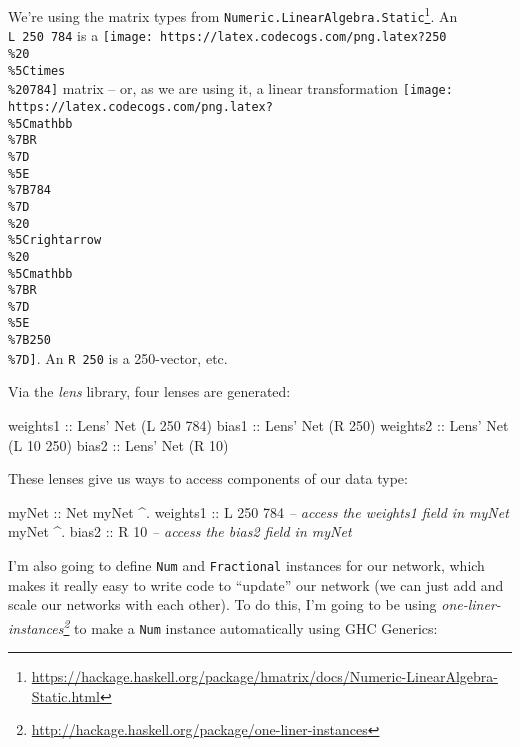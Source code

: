 \documentclass[]{article}
\newenvironment{Shaded}{}{}
\newcommand{\CommentTok}[1]{\textcolor[rgb]{0.38,0.63,0.69}{\textit{#1}}}
\newcommand{\DataTypeTok}[1]{\textcolor[rgb]{0.56,0.13,0.00}{#1}}
\newcommand{\DecValTok}[1]{\textcolor[rgb]{0.25,0.63,0.44}{#1}}
\newcommand{\FunctionTok}[1]{\textcolor[rgb]{0.02,0.16,0.49}{#1}}
\newcommand{\NormalTok}[1]{#1}
\newcommand{\OtherTok}[1]{\textcolor[rgb]{0.00,0.44,0.13}{#1}}
\renewcommand{\href}[2]{#2\footnote{\url{#1}}}
\begin{document}
We're using the matrix types from
\href{https://hackage.haskell.org/package/hmatrix/docs/Numeric-LinearAlgebra-Static.html}{\texttt{Numeric.LinearAlgebra.Static}}.
An \texttt{L\ 250\ 784} is a
\texttt{[image: https://latex.codecogs.com/png.latex?250\\\%20\\\%5Ctimes\\\%20784]}
matrix -- or, as we are using it, a linear transformation
\texttt{[image: https://latex.codecogs.com/png.latex?\\\%5Cmathbb\\\%7BR\\\%7D\\\%5E\\\%7B784\\\%7D\\\%20\\\%5Crightarrow\\\%20\\\%5Cmathbb\\\%7BR\\\%7D\\\%5E\\\%7B250\\\%7D]}.
An \texttt{R\ 250} is a 250-vector, etc.

Via the \emph{lens} library, four lenses are generated:

\begin{Shaded}
\begin{Highlighting}[]
\OtherTok{weights1 ::} \DataTypeTok{Lens'} \DataTypeTok{Net}\NormalTok{ (}\DataTypeTok{L} \DecValTok{250} \DecValTok{784}\NormalTok{)}
\OtherTok{bias1    ::} \DataTypeTok{Lens'} \DataTypeTok{Net}\NormalTok{ (}\DataTypeTok{R} \DecValTok{250}\NormalTok{)}
\OtherTok{weights2 ::} \DataTypeTok{Lens'} \DataTypeTok{Net}\NormalTok{ (}\DataTypeTok{L} \DecValTok{10}  \DecValTok{250}\NormalTok{)}
\OtherTok{bias2    ::} \DataTypeTok{Lens'} \DataTypeTok{Net}\NormalTok{ (}\DataTypeTok{R} \DecValTok{10}\NormalTok{)}
\end{Highlighting}
\end{Shaded}

These lenses give us ways to access components of our data type:

\begin{Shaded}
\begin{Highlighting}[]
\OtherTok{myNet             ::} \DataTypeTok{Net}
\NormalTok{myNet }\FunctionTok{^.}\OtherTok{ weights1 ::} \DataTypeTok{L} \DecValTok{250} \DecValTok{784}  \CommentTok{-- access the weights1 field in myNet}
\NormalTok{myNet }\FunctionTok{^.}\OtherTok{ bias2    ::} \DataTypeTok{R}  \DecValTok{10}      \CommentTok{-- access the bias2 field in myNet}
\end{Highlighting}
\end{Shaded}

I'm also going to define \texttt{Num} and \texttt{Fractional} instances for our
network, which makes it really easy to write code to ``update'' our network (we
can just add and scale our networks with each other). To do this, I'm going to
be using
\emph{\href{http://hackage.haskell.org/package/one-liner-instances}{one-liner-instances}}
to make a \texttt{Num} instance automatically using GHC Generics:
\end{document}
